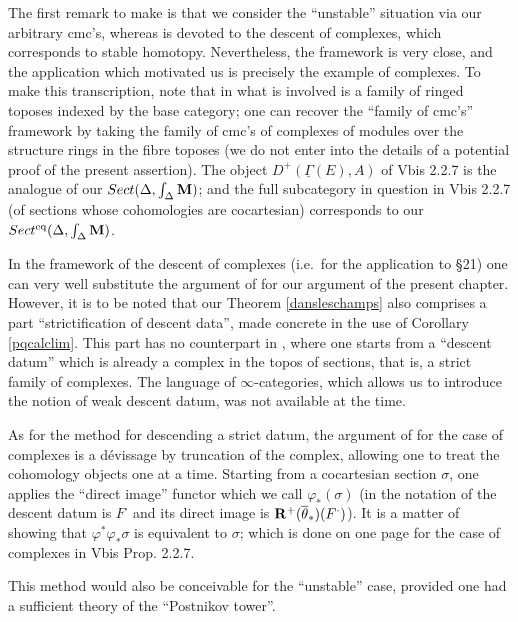 The first remark to make is that we consider the
``unstable'' situation via our
arbitrary cmc's, whereas \cite{SGA4b} is devoted to the descent of
complexes, which
corresponds to stable homotopy. Nevertheless, the framework is very close,
and the application which
motivated us is precisely the example of complexes. To make this
transcription, note that
in \cite{SGA4b} what is involved is a family of ringed toposes indexed
by the base
category; one can recover the ``family of cmc's'' framework by taking the
family of
cmc's of complexes of
modules over the structure rings in the fibre toposes (we do not enter
into the details of a
potential proof of the present assertion). The object
$D^+(\underline{\Gamma}(E), A)$
of \cite{SGA4b} Vbis 2.2.7 is the analogue of our $Sect (\Delta , \int
_{\Delta}{\bf M} )$; and
the full subcategory in question in
\cite{SGA4b} Vbis 2.2.7 (of sections whose cohomologies are
cocartesian) corresponds to our $Sect ^{\rm eq}(\Delta , \int
_{\Delta}{\bf M} )$.

In the framework of the descent of complexes (i.e.\ for the application to
\S 21) one can very well
substitute the argument of \cite{SGA4b} for our argument of the present
chapter. However, it is
to be noted that our Theorem \ref{dansleschamps} also comprises a part
``strictification of
descent data'', made concrete in the use of Corollary
\ref{pqcalclim}.
This part has no counterpart in \cite{SGA4b}, where one starts
from a ``descent
datum'' which is already a complex in the topos of sections,
that is, a strict family
of complexes. The language of
$\infty$-categories, which allows us to introduce
the notion of weak descent datum, was not available at the time.

As for the method
for descending a strict datum, the argument of
\cite{SGA4b} for the case
of complexes is a dévissage by truncation of the complex, allowing one to
treat the cohomology objects one at a time. Starting from a cocartesian
section $\sigma$, one applies the
``direct image'' functor which we call $\varphi _{\ast}(\sigma )$
(in the notation of
\cite{SGA4b} the descent datum is $F^{\cdot}$ and its direct image is
${\bf R}^+ (\overline{\theta}_{\ast})(F^{\cdot})$). It is a matter of showing
that $\varphi
^{\ast}\varphi_{\ast} \sigma  $ is equivalent to $\sigma$; which is
done on one page for the
case of complexes in \cite{SGA4b} Vbis Prop. 2.2.7.

This method would also be conceivable for the ``unstable'' case,
provided one had
a sufficient theory of the ``Postnikov tower''.


